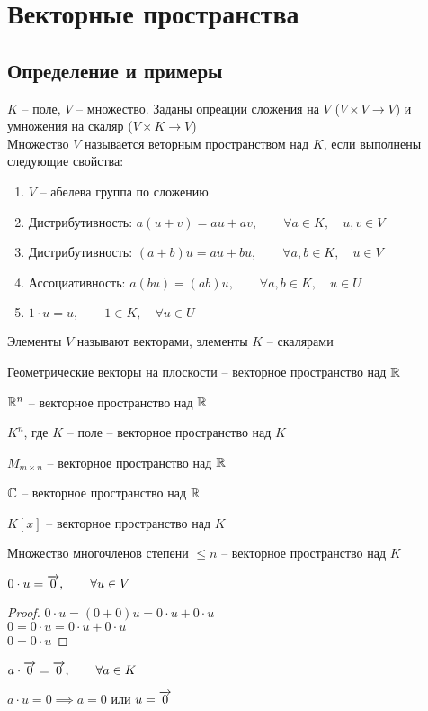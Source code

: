 \chapter{Векторные пространства}

\section{Определение и примеры}

\begin{definition}
	$K$ -- поле, $V$ -- множество. Заданы опреации сложения на $V$ ($V \times V \to V$) и умножения на скаляр ($V \times K \to V$) \\
    Множество $V$ называется веторным пространством над $K$, если выполнены следующие свойства:
    \begin{enumerate}
    	\item $V$ -- абелева группа по сложению
        \item Дистрибутивность: $ a(u + v) = au + av, \qquad \forall a \in K, \quad u, v \in V $
        \item Дистрибутивность: $ (a + b)u = au + bu, \qquad \forall a, b \in K, \quad u \in V $
        \item Ассоциативность: $ a(bu) = (ab)u, \qquad \forall a, b \in K, \quad u \in U $
        \item $ 1 \cdot u = u, \qquad 1 \in K, \quad \forall u \in U $
    \end{enumerate}
    Элементы $V$ называют векторами, элементы $K$ -- скалярами
\end{definition}

\begin{exmpls}
	\item Геометрические векторы на плоскости -- векторное пространство над $\mathbb{R}$
    \item $\mathbb{R}^n$ -- векторное пространство над $\mathbb{R}$
    \item $K^n$, где $K$ -- поле -- векторное пространство над $K$
    \item $M_{m \times n}$ -- векторное пространство над $\mathbb{R}$
    \item $\mathbb{C}$ -- векторное пространство над $\mathbb{R}$
    \item $K[x]$ -- векторное пространство над $K$
    \item Множество многочленов степени $\bm\le n$ -- векторное пространство над $K$
\end{exmpls}

\begin{props}
    \item $ 0 \cdot u = \overrightarrow{0}, \qquad \forall u \in V $
    \begin{proof}
    	$ 0 \cdot u = (0 + 0)u = 0 \cdot u + 0 \cdot u $ \\
        $ 0 = 0 \cdot u = 0 \cdot u + 0 \cdot u $ \\
        $ 0 = 0 \cdot u $
    \end{proof}
    \item $ a \cdot \overrightarrow{0} = \overrightarrow{0}, \qquad \forall a \in K $
    \item $a \cdot u = 0 \implies a = 0 $ или $ u = \overrightarrow{0} $
\end{props}

